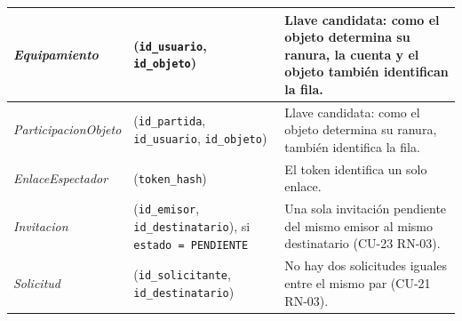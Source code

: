 \begin{center}
\begin{longtable}{|L{0.2\textwidth}|L{0.25\textwidth}|L{0.45\textwidth}|}
\textit{Equipamiento} & (\texttt{id\_\allowbreak{}usuario}, \texttt{id\_\allowbreak{}objeto}) & Llave candidata: como el objeto determina su ranura, la cuenta y el objeto también identifican la fila. \\ \hline
\textit{Participacion\-Objeto} & (\texttt{id\_\allowbreak{}partida}, \texttt{id\_\allowbreak{}usuario}, \texttt{id\_\allowbreak{}objeto}) & Llave candidata: como el objeto determina su ranura, también identifica la fila. \\ \hline
\textit{Enlace\-Espectador} & (\texttt{token\_\allowbreak{}hash}) & El token identifica un solo enlace. \\ \hline
\textit{Invitacion} & (\texttt{id\_\allowbreak{}emisor}, \texttt{id\_\allowbreak{}destinatario}), si \texttt{estado = PENDIENTE} & Una sola invitación pendiente del mismo emisor al mismo destinatario (\mbox{CU-23} \mbox{RN-03}). \\ \hline
\textit{Solicitud} & (\texttt{id\_\allowbreak{}solicitante}, \texttt{id\_\allowbreak{}destinatario}) & No hay dos solicitudes iguales entre el mismo par (\mbox{CU-21} \mbox{RN-03}). \\ \hline
\end{longtable}
\end{center}
